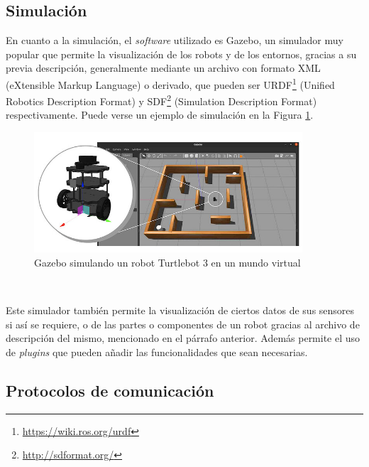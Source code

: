 \subsection{Simulación}
\label{sec:simulacion}

En cuanto a la simulación, el \textit{software} utilizado es Gazebo, un
simulador muy popular que permite la visualización de los robots y de los
entornos, gracias a su previa descripción, generalmente mediante un archivo con
formato XML (eXtensible Markup Language) o derivado, que pueden ser
URDF\footnote{\href{https://wiki.ros.org/urdf}{https://wiki.ros.org/urdf}}
(Unified Robotics Description Format) y SDF\footnote{
\href{http://sdformat.org/}{http://sdformat.org/}} (Simulation Description
Format) respectivamente.
Puede verse un ejemplo de simulación en la Figura \ref{fig:gazebo_sim}.
\\

\begin{figure} [h!]
  \begin{center}
    \includegraphics[width=10cm]{figs/gazebo_sim}
  \end{center}
  \caption{Gazebo simulando un robot Turtlebot 3 en un mundo virtual \cite{gazebo}}
  \label{fig:gazebo_sim}
\end{figure}\

Este simulador también permite la visualización de ciertos datos de sus sensores
si así se requiere, o de las partes o componentes de un robot gracias al archivo
de descripción del mismo, mencionado en el párrafo anterior.
Además permite el uso de \textit{plugins} que pueden añadir las funcionalidades
que sean necesarias.
\\


\subsection{Protocolos de comunicación}
\label{sec:protocolos_comunicacion}

